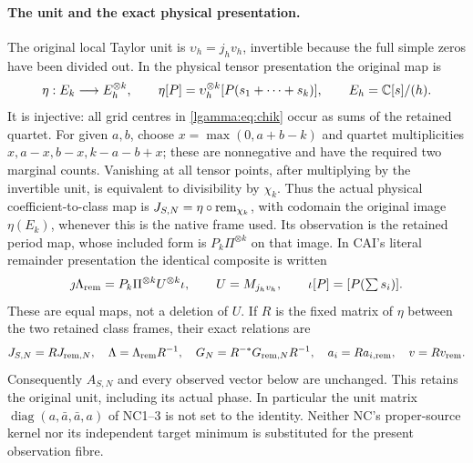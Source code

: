 \documentclass[11pt]{article}
\begin{document}
\paragraph{The unit and the exact physical presentation.}
The original local Taylor unit is $\upsilon_h=j_hv_h$, invertible
because the full simple zeros have been divided out.  In the physical
tensor presentation the original map is
\[
 \eta:E_k\longrightarrow E_h^{\otimes k},\qquad
 \eta[P]=\upsilon_h^{\otimes k}[P(s_1+\cdots+s_k)],
 \qquad E_h=\mathbb C[s]/(h).
\]
It is injective: all grid centres in \eqref{lgamma:eq:chik} occur as sums of
the retained quartet.  For given $a,b$, choose $x=\max(0,a+b-k)$
and quartet multiplicities $x,a-x,b-x,k-a-b+x$; these are nonnegative
and have the required two marginal counts.  Vanishing at all tensor
points, after multiplying
by the invertible unit, is equivalent to divisibility by $\chi_k$.
Thus the actual physical coefficient-to-class map is
$J_{S,N}=\eta\circ\operatorname{rem}_{\chi_k}$, with codomain the original image
$\eta(E_k)$, whenever this is the native frame used.  Its observation
is the retained period map, whose included form is
$P_k\Pi^{\otimes k}$ on that image.  In CAI's literal remainder
presentation the identical composite is written
\[
 \jmath\Lambda_{\rm rem}
 =P_k\Pi^{\otimes k}U^{\otimes k}\iota,
 \qquad U=M_{j_hv_h},\qquad \iota[P]=[P(\textstyle\sum s_i)].
\]
These are equal maps, not a deletion of $U$.  If $R$ is the fixed
matrix of $\eta$ between the two retained class frames, their exact
relations are
\begin{equation}\label{lgamma:eq:unitframe}
 J_{S,N}=R J_{{\rm rem},N},\quad
 \Lambda=\Lambda_{\rm rem}R^{-1},\quad
 G_N=R^{-*}G_{{\rm rem},N}R^{-1},\quad
 a_i=R a_{i,\rm rem},\quad v=Rv_{\rm rem}.
\end{equation}
Consequently $A_{S,N}$ and every observed vector below are unchanged.
This retains the original unit, including its actual phase.  In
particular the unit matrix $\operatorname{diag}(a,\bar a,\bar a,a)$
of NC1--3 \cite{lgamma:NC} is not set to the identity.  Neither NC's
proper-source kernel nor its independent target minimum is substituted
for the present observation fibre.
\end{document}
